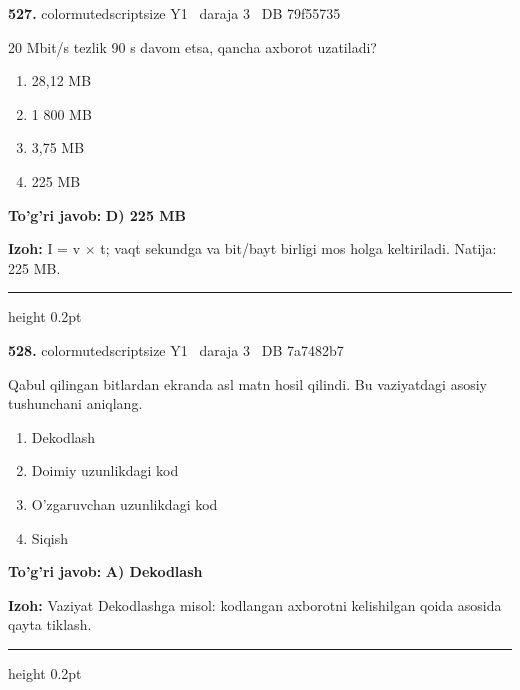 \documentclass[10pt,a4paper,oneside]{article}
\begin{document}
\noindent\textbf{\color{ink}527.}  {color{muted}scriptsize Y1 \textbullet\ daraja 3 \textbullet\ DB 79f55735}
\par
20 Mbit/s tezlik 90 s davom etsa, qancha axborot uzatiladi?
\begin{enumerate}[label=\Alph*),leftmargin=9mm]
\item 28,12 MB
\item 1 800 MB
\item 3,75 MB
\item 225 MB
\end{enumerate}
\begin{tcolorbox}[enhanced,breakable,colback=teal!4,colframe=teal!50!black,boxrule=0.5pt,arc=1.1mm,left=3mm,right=3mm,top=1.7mm,bottom=1.7mm,before skip=2mm,after skip=2mm]
\textbf{\color{teal}To'g'ri javob:} \textbf{D) 225 MB}
\par\smallskip
\textbf{Izoh:} I = v \ensuremath{\times} t; vaqt sekundga va bit/bayt birligi mos holga keltiriladi. Natija: 225 MB.
\end{tcolorbox}
\vspace{2mm}\hrule height 0.2pt \vspace{3mm}

\noindent\textbf{\color{ink}528.}  {color{muted}scriptsize Y1 \textbullet\ daraja 3 \textbullet\ DB 7a7482b7}
\par
Qabul qilingan bitlardan ekranda asl matn hosil qilindi. Bu vaziyatdagi asosiy tushunchani aniqlang.
\begin{enumerate}[label=\Alph*),leftmargin=9mm]
\item Dekodlash
\item Doimiy uzunlikdagi kod
\item O'zgaruvchan uzunlikdagi kod
\item Siqish
\end{enumerate}
\begin{tcolorbox}[enhanced,breakable,colback=teal!4,colframe=teal!50!black,boxrule=0.5pt,arc=1.1mm,left=3mm,right=3mm,top=1.7mm,bottom=1.7mm,before skip=2mm,after skip=2mm]
\textbf{\color{teal}To'g'ri javob:} \textbf{A) Dekodlash}
\par\smallskip
\textbf{Izoh:} Vaziyat Dekodlashga misol: kodlangan axborotni kelishilgan qoida asosida qayta tiklash.
\end{tcolorbox}
\vspace{2mm}\hrule height 0.2pt \vspace{3mm}
\end{document}
